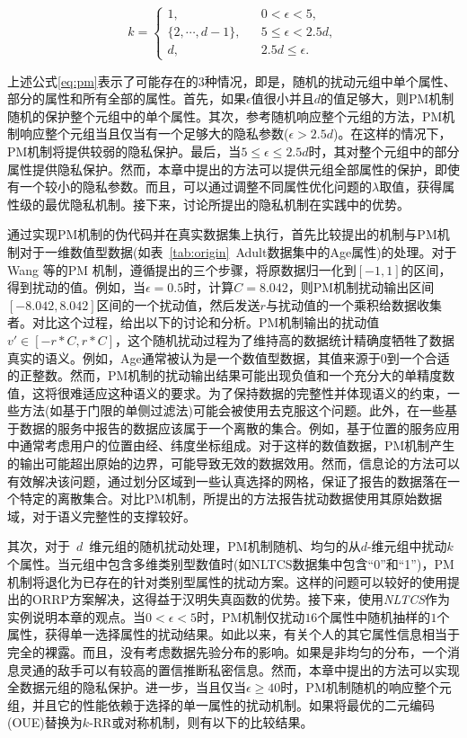 \begin{equation}\label{eq:pm}
	k=\left\{
	\begin{array}{lcl}
		1, & & {0 < \epsilon <5},\\
		{\{2,\cdots,d-1\}}, & & {5 \leq \epsilon <2.5d},\\
		d, & & {2.5d \leq \epsilon}.
	\end{array}\right.
\end{equation}

上述公式\ref{eq:pm}表示了可能存在的$3$种情况，即是，随机的扰动元组中单个属性、部分的属性和所有全部的属性。首先，如果$\epsilon$值很小并且$d$的值足够大，则PM机制随机的保护整个元组中的单个属性。其次，参考随机响应整个元组的方法\cite{andres2013geo}，PM机制响应整个元组当且仅当有一个足够大的隐私参数($\epsilon>2.5d$)。在这样的情况下，PM机制将提供较弱的隐私保护。最后，当$5\leq \epsilon \leq 2.5d$时，其对整个元组中的部分属性提供隐私保护。然而，本章中提出的方法可以提供元组全部属性的保护，即使有一个较小的隐私参数。而且，可以通过调整不同属性优化问题的$\lambda$取值，获得属性级的最优隐私机制。接下来，讨论所提出的隐私机制在实践中的优势。

通过实现PM机制的伪代码并在真实数据集上执行，首先比较提出的机制与PM机制对于一维数值型数据(如表~\ref{tab:origin}~Adult数据集中的Age属性)的处理。对于Wang 等的PM 机制，遵循提出的三个步骤，将原数据归一化到$[-1,1]$的区间，得到扰动的值。例如，当$\epsilon=0.5$时，计算$C=8.042$，则PM机制扰动输出区间$[-8.042,8.042]$区间的一个扰动值，然后发送$r$与扰动值的一个乘积给数据收集者。对比这个过程，给出以下的讨论和分析。PM机制输出的扰动值$v' \in [-r*C,r*C]$，这个随机扰动过程为了维持高的数据统计精确度牺牲了数据真实的语义。例如，Age通常被认为是一个数值型数据，其值来源于$0$到一个合适的正整数。然而，PM机制的扰动输出结果可能出现负值和一个充分大的单精度数值，这将很难适应这种语义的要求。为了保持数据的完整性并体现语义的约束，一些方法(如基于门限的单侧过滤法)可能会被使用去克服这个问题。此外，在一些基于数据的服务中报告的数据应该属于一个离散的集合。例如，基于位置的服务应用中通常考虑用户的位置由经、纬度坐标组成。对于这样的数值数据，PM机制产生的输出可能超出原始的边界，可能导致无效的数据效用。然而，信息论的方法可以有效解决该问题，通过划分区域到一些认真选择的网格\cite{zhang2019online}，保证了报告的数据落在一个特定的离散集合\cite{oya2017back}。对比PM机制，所提出的方法报告扰动数据使用其原始数据域，对于语义完整性的支撑较好。

其次，对于~$d$~维元组的随机扰动处理，PM机制随机、均匀的从$d$-维元组中扰动$k$个属性。当元组中包含多维类别型数值时(如NLTCS数据集中包含``0''和``1'')，PM机制将退化为已存在的针对类别型属性的扰动方案。这样的问题可以较好的使用提出的ORRP方案解决，这得益于汉明失真函数的优势。接下来，使用{\em NLTCS}作为实例说明本章的观点。当$0<\epsilon < 5$时，PM机制仅扰动$16$个属性中随机抽样的$1$个属性，获得单一选择属性的扰动结果。如此以来，有关个人的其它属性信息相当于完全的裸露。而且，没有考虑数据先验分布的影响。如果是非均匀的分布，一个消息灵通的敌手可以有较高的置信推断私密信息。然而，本章中提出的方法可以实现全数据元组的隐私保护。进一步，当且仅当$\epsilon \geq 40$时，PM机制随机的响应整个元组，并且它的性能依赖于选择的单一属性的扰动机制。如果将最优的二元编码(OUE)\cite{wang2017locally}替换为$k$-RR或对称机制，则有以下的比较结果。

